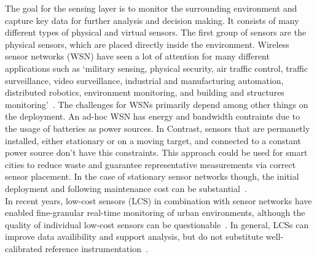 The goal for the sensing layer is to monitor the surrounding environment and capture key data for further analysis and decision making. It consists of many different types of physical and virtual sensors. The first group of sensors are the physical sensors, which are placed directly inside the environment. Wireless sensor networks (WSN) have seen a lot of attention for many different applications such as `military sensing, physical security, air traffic control, traffic surveillance, video surveillance, industrial and manufacturing automation, distributed robotics, environment monitoring, and building and structures monitoring'~\cite{chong2003sensor}. The challenges for WSNs primarily depend among other things on the deployment. An ad-hoc WSN has energy and bandwidth contraints due to the usage of batteries as power sources.
In Contrast, sensors that are permanetly installed, either stationary or on a moving target, and connected to a constant power source don't have this constraints. This approach could be used for smart cities to reduce waste and guarantee representative measurements via correct sensor placement. In the case of stationary sensor networks though, the initial deployment and following maintenance cost can be substantial~\cite{chapman2015birmingham}.\\
In recent years, low-cost sensors (LCS) in combination with sensor networks have enabled fine-granular real-time monitoring of urban environments, although the quality of individual low-cost sensors can be questionable~\cite{castell2017can}. In general, LCSs can improve data availibility and support analysis, but do not substitute well-calibrated reference instrumentation~\cite{lewis2018low}.

